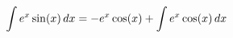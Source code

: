 \documentclass[preview]{standalone}
\begin{document}
\begin{align*}
\special{dvisvgm:raw <g id='unique000'>}\int e^x \sin(x) \, dx = -e^x \cos(x) + \int e^x \cos(x) \, dx\special{dvisvgm:raw </g>}
\end{align*}
\end{document}
